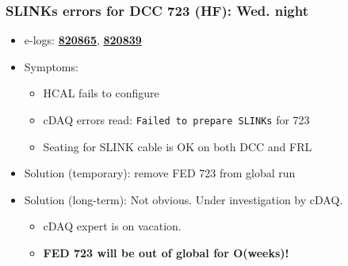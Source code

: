 \documentclass[bigger]{beamer}
\providecommand{\alert}[1]{\textbf{#1}}
\begin{document}
\begin{frame}
\frametitle{SLINKs errors for DCC 723 (HF): Wed. night}
\label{sec-2-1-3}
\begin{itemize}

\item e-logs: \href{http://cmsonline.cern.ch/cms-elog/820865}{\alert{820865}}, \href{http://cmsonline.cern.ch/cms-elog/820839}{\alert{820839}}
\label{sec-2-1-3-1}%

\item Symptoms:
\label{sec-2-1-3-2}%
\begin{itemize}

\item HCAL fails to configure
\label{sec-2-1-3-2-1}%

\item cDAQ errors read: \texttt{Failed to prepare SLINKs} for 723
\label{sec-2-1-3-2-2}%

\item Seating for SLINK cable is OK on both DCC and FRL
\label{sec-2-1-3-2-3}%
\end{itemize} %

\item Solution (temporary): remove FED 723 from global run
\label{sec-2-1-3-3}%

\item Solution (long-term): Not obvious.  Under investigation by cDAQ.
\label{sec-2-1-3-4}%
\begin{itemize}

\item cDAQ expert is on vacation.
\label{sec-2-1-3-4-1}%

\item \alert{FED 723 will be out of global for O(weeks)!}
\label{sec-2-1-3-4-2}%
\end{itemize} %
\end{itemize} %
\end{frame}
\end{document}
